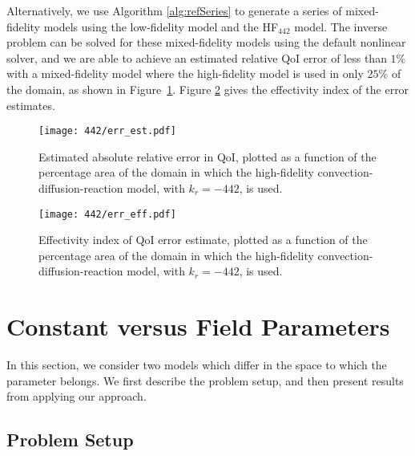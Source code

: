 Alternatively, we use Algorithm \ref{alg:refSeries} to generate a series of mixed-fidelity models using the low-fidelity model and the HF$_{442}$ model. The inverse problem can be solved for these mixed-fidelity models using the default nonlinear solver, and we are able to achieve an estimated relative QoI error of less than $1\%$ with a mixed-fidelity model where the high-fidelity model is used in only $25\%$ of the domain, as shown in Figure~\ref{fig:442Err}. Figure \ref{fig:442ErrEff} gives the effectivity index of the error estimates.

\begin{figure}[h]
\centering
\texttt{[image: 442/err\_est.pdf]}
\caption{Estimated absolute relative error in QoI, plotted as a function of the percentage area of the domain in which the high-fidelity convection-diffusion-reaction model, with $k_r=-442$, is used.}
\label{fig:442Err}
\end{figure}

\begin{figure}[h]
\centering
\texttt{[image: 442/err\_eff.pdf]}
\caption{Effectivity index of QoI error estimate, plotted as a function of the percentage area of the domain in which the high-fidelity convection-diffusion-reaction model, with $k_r=-442$, is used.}
\label{fig:442ErrEff}
\end{figure}

\section{Constant versus Field Parameters}  \label{sec:constvfield}

In this section, we consider two models which differ in the space to which the parameter belongs. We first describe the problem setup, and then present results from applying our approach.

\subsection{Problem Setup} %

